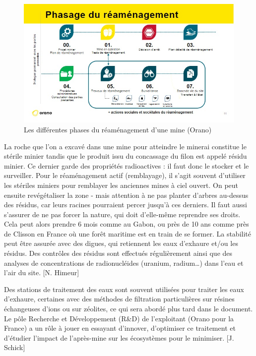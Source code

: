 \documentclass{article}
\begin{document}
\begin{figure}[!h]
    \centering
    \includegraphics[width=\linewidth]{I_B_1.jpg}
    \caption{Les différentes phases du réaménagement d'une mine (Orano)}
    \label{fig:phases_reamenagement}
\end{figure}

La roche que l’on a excavé dans une mine pour atteindre le minerai constitue le stérile minier tandis que le produit issu du concassage du filon est appelé résidu minier. Ce dernier garde des propriétés radioactives : il faut donc le stocker et le surveiller.
Pour le réaménagement actif (remblayage), il s’agit souvent d’utiliser les stériles miniers pour remblayer les anciennes mines à ciel ouvert. On peut ensuite revégétaliser la zone - mais attention à ne pas planter d’arbres au-dessus des résidus, car leurs racines pourraient percer jusqu’à ces derniers. Il faut aussi s’assurer de ne pas forcer la nature, qui doit d’elle-même reprendre ses droits. Cela peut alors prendre 6 mois comme au Gabon, ou près de 10 ans comme près de Clisson en France où une forêt maritime est en train de se former. La stabilité peut être assurée avec des digues, qui retiennent les eaux d’exhaure et/ou les résidus. Des contrôles des résidus sont effectués régulièrement ainsi que des analyses de concentrations de radionucléides (uranium, radium…) dans l’eau et l’air du site.  [N. Himeur]

Des stations de traitement des eaux sont souvent utilisées pour traiter les eaux d’exhaure, certaines avec des méthodes de filtration particulières sur résines échangeuses d’ions ou sur zéolites, ce qui sera abordé plus tard dans le document. Le pôle Recherche et Développement (R\&D) de l’exploitant (Orano pour la France) a un rôle à jouer en essayant d’innover, d’optimiser ce traitement et d’étudier l’impact de l’après-mine sur les écosystèmes pour le minimiser. [J. Schick]
\end{document}
